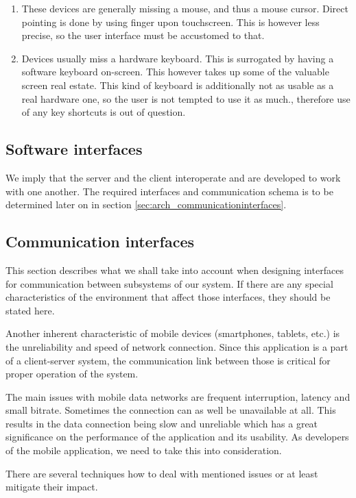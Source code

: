 \documentclass[11pt]{book}
\begin{document}
\begin{enumerate}
  \item These devices are generally missing a mouse, and thus a mouse cursor. Direct pointing is done by using finger upon touchscreen. This is however less precise, so the user interface must be accustomed to that.
  \item Devices usually miss a hardware keyboard. This is surrogated by having a software keyboard on-screen. This however takes up some of the valuable screen real estate. This kind of keyboard is additionally not as usable as a real hardware one, so the user is not tempted to use it as much., therefore use of any key shortcuts is out of question.
\end{enumerate}

\subsection{Software interfaces}
We imply that the server and the client interoperate and are developed to work with one another. The required interfaces and communication schema is to be determined later on in section \ref{sec:arch_communicationinterfaces}.

\subsection{Communication interfaces}
This section describes what we shall take into account when designing interfaces for communication between subsystems of our system. If there are any special characteristics of the environment that affect those interfaces, they should be stated here.

Another inherent characteristic of mobile devices (smartphones, tablets, etc.) is the unreliability and speed of network connection. Since this application is a part of a client-server system, the communication link between those is critical for proper operation of the system.

The main issues with mobile data networks are frequent interruption, latency and small bitrate. Sometimes the connection can as well be unavailable at all. This results in the data connection being slow and unreliable which has a great significance on the performance of the application and its usability. As developers of the mobile application, we need to take this into consideration.

There are several techniques how to deal with mentioned issues or at least mitigate their impact.
\end{document}
